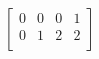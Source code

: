 \documentclass{article}
\begin{document}
 $
\left[
\begin{array}{c|c|c|c}
0 & 0 & 0 & 1 \\
0 & 1 & 2 & 2 \\
\end{array}
\right] $
\end{document}
